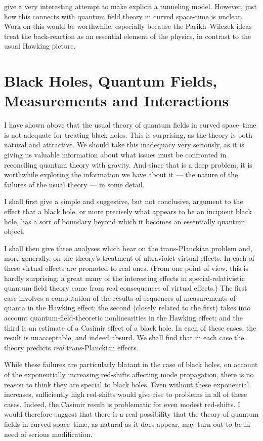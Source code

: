 \documentclass[
%
draft    %
,numberedheadings 
,bibliocites
  ]
  {aipproc}
\begin{document}
\citet{Parikh:1999mf} give a very interesting attempt to make explicit a tunneling model.  However, just how this connects with quantum field theory in curved space-time is unclear.  Work on this would be worthwhile, especially because the Parikh--Wilczek ideas treat the back-reaction as an essential element of the physics, in contrast to the usual Hawking picture.


\section{Black Holes, Quantum Fields, \protect\\ Measurements and Interactions}\label{moreqft}

I have shown above that the usual theory of quantum fields in curved space--time is not adequate for treating black holes.  This is surprising, as the theory is both natural and attractive.
We should take this inadequacy very seriously, as it is giving us valuable information about what issues must be confronted in reconciling quantum theory with gravity.  And since that is a deep problem, it is worthwhile exploring the information we have about it --- the nature of the failures of the usual theory --- in some detail.  

I shall first give a simple and suggestive, but not conclusive, argument to the effect that a black hole, or more precisely what appears to be an incipient black hole, has a sort of boundary beyond which it becomes an essentially quantum object. 

I shall then give three analyses which bear on the trans-Planckian problem and, more generally, on the theory's treatment of ultraviolet virtual effects.  In each of these virtual effects are promoted to real ones.  (From one point of view, this is hardly surprising; a great many of the interesting effects in special-relativistic quantum field theory come from real consequences of virtual effects.)  The first case involves a computation of the results of sequences of measurements of quanta in the Hawking effect; the second (closely related to the first) takes into account quantum-field-theoretic nonlinearities in the Hawking effect; and the third is an estimate of a Casimir effect of a black hole.
In each of these cases, the result is unacceptable, and indeed absurd.  We shall find that in each case the theory predicts {\em real} trans-Planckian effects.

While these failures are particularly blatant in the case of black holes, on account of the exponentially increasing red-shifts affecting mode propagation, there is no reason to think they are special to black holes.  Even without these exponential increases, sufficiently high red-shifts would give rise to problems in all of these cases.  Indeed, the Casimir result is problematic for even modest red-shifts.
I would therefore suggest that there is a real possibility that the theory of quantum fields in curved space--time, as natural as it does appear, may turn out to be in need of serious modification.  
\end{document}
